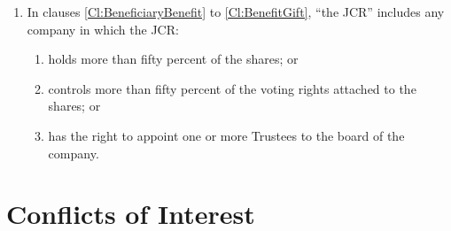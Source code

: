 \documentclass[11pt,a4paper, oneside]{memoir}
\begin{document}
\begin{enumerate}
\begin{enumerate}
		\end{enumerate}
		\item In clauses \ref{Cl:BeneficiaryBenefit} to \ref{Cl:BenefitGift}, ``the JCR'' includes any company in which the JCR:
		\begin{enumerate}
			\item holds more than fifty percent of the shares; or
			\item controls more than fifty percent of the voting rights attached to the shares; or
			\item has the right to appoint one or more Trustees to the board of the company.
		\end{enumerate}
	\end{enumerate}
	\section{Conflicts of Interest}
\end{document}

